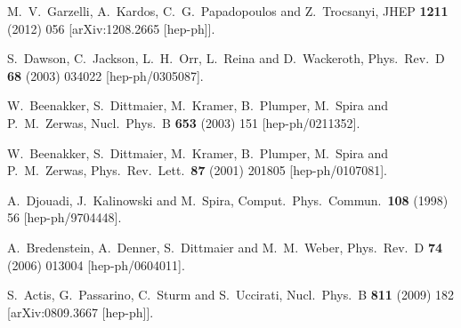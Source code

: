 \documentclass[preprintnumbers,superscriptaddress,nofootinbib,aps,prd,floatfix]{revtex4}
\begin{document}
\begin{thebibliography}{99}
  M.~V.~Garzelli, A.~Kardos, C.~G.~Papadopoulos and Z.~Trocsanyi,
  JHEP {\bf 1211} (2012) 056
  [arXiv:1208.2665 [hep-ph]].
  
  S.~Dawson, C.~Jackson, L.~H.~Orr, L.~Reina and D.~Wackeroth,
  Phys.\ Rev.\ D {\bf 68} (2003) 034022
  [hep-ph/0305087].
  
  W.~Beenakker, S.~Dittmaier, M.~Kramer, B.~Plumper, M.~Spira and P.~M.~Zerwas,
  Nucl.\ Phys.\ B {\bf 653} (2003) 151
  [hep-ph/0211352].
  
  W.~Beenakker, S.~Dittmaier, M.~Kramer, B.~Plumper, M.~Spira and P.~M.~Zerwas,
  Phys.\ Rev.\ Lett.\  {\bf 87} (2001) 201805
  [hep-ph/0107081].
  
  A.~Djouadi, J.~Kalinowski and M.~Spira,
  Comput.\ Phys.\ Commun.\  {\bf 108} (1998) 56
  [hep-ph/9704448].
  
  A.~Bredenstein, A.~Denner, S.~Dittmaier and M.~M.~Weber,
  Phys.\ Rev.\ D {\bf 74} (2006) 013004
  [hep-ph/0604011].
  
  S.~Actis, G.~Passarino, C.~Sturm and S.~Uccirati,
  Nucl.\ Phys.\ B {\bf 811} (2009) 182
  [arXiv:0809.3667 [hep-ph]].
  

\end{thebibliography}
\end{document}
